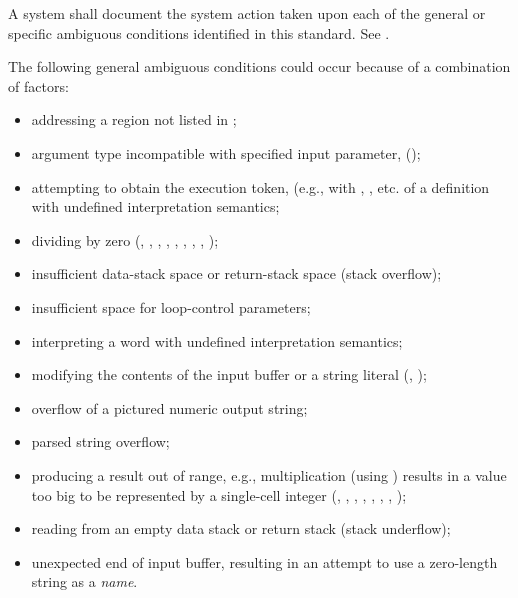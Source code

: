 A system shall document the system action taken upon each of the
general or specific ambiguous conditions identified in this
standard. See .

The following general ambiguous conditions could occur because of a
combination of factors:

\begin{itemize}
%
\item addressing a region not listed in ;
%
\item argument type incompatible with specified input parameter,
	();
%
\item attempting to obtain the execution token, (e.g., with
	, , etc. of a definition
	with undefined interpretation semantics;
%
\item dividing by zero
	(,
	 ,
	 ,
	 ,
	 ,
	 ,
	 ,
	 ,
	 );
%
\item insufficient data-stack space or return-stack space (stack
	overflow);
%
\item insufficient space for loop-control parameters;
%
\item interpreting a word with undefined interpretation semantics;
%
\item modifying the contents of the input buffer or a string literal
	(,
	);
%
\item overflow of a pictured numeric output string;
%
\item parsed string overflow;
%
\item producing a result out of range, e.g., multiplication
	(using \word{*}) results in a value too big to be represented by
	a single-cell integer
	(,
	 ,
	 ,
	 ,
	 ,
	 ,
	 ,
	 );
%
\item reading from an empty data stack or return stack
	(stack underflow);
%
\item unexpected end of input buffer, resulting in an attempt to
	use a zero-length string as a \emph{name}.
\end{itemize}


